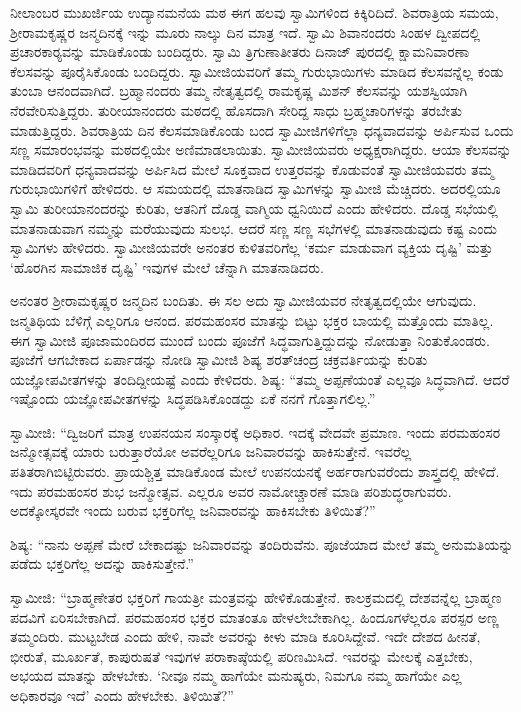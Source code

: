  ನೀಲಾಂಬರ ಮುಖರ್ಜಿಯ ಉದ್ಯಾನಮನೆಯ ಮಠ ಈಗ ಹಲವು ಸ್ವಾಮಿಗಳಿಂದ ಕಿಕ್ಕಿರಿದಿದೆ. ಶಿವರಾತ್ರಿಯ ಸಮಯ, ಶ‍್ರೀರಾಮಕೃಷ್ಣರ ಜನ್ಮದಿನಕ್ಕೆ ಇನ್ನು ಮೂರು ನಾಲ್ಕು ದಿನ ಮಾತ್ರ ಇದೆ. ಸ್ವಾಮಿ ಶಿವಾನಂದರು ಸಿಂಹಳ ದ್ವೀಪದಲ್ಲಿ ಪ್ರಚಾರಕಾರ‍್ಯವನ್ನು ಮಾಡಿಕೊಂಡು ಬಂದಿದ್ದರು. ಸ್ವಾಮಿ ತ್ರಿಗುಣಾತೀತರು ದಿನಾಜ್ ಪುರದಲ್ಲಿ ಕ್ಷಾಮನಿವಾರಣಾ ಕೆಲಸವನ್ನು ಪೂರೈಸಿಕೊಂಡು ಬಂದಿದ್ದರು. ಸ್ವಾಮೀಜಿಯವರಿಗೆ ತಮ್ಮ ಗುರುಭಾಯಿಗಳು ಮಾಡಿದ ಕೆಲಸವನ್ನೆಲ್ಲ ಕಂಡು ತುಂಬಾ ಆನಂದವಾಗಿದೆ. ಬ್ರಹ್ಮಾನಂದರು ತಮ್ಮ ನೇತೃತ್ವದಲ್ಲಿ ರಾಮಕೃಷ್ಣ ಮಿಶನ್ ಕೆಲಸವನ್ನು ಯಶಸ್ವಿಯಾಗಿ ನೆರವೇರಿಸುತ್ತಿದ್ದರು. ತುರೀಯಾನಂದರು ಮಠದಲ್ಲಿ ಹೊಸದಾಗಿ ಸೇರಿದ್ದ ಸಾಧು ಬ್ರಹ್ಮಚಾರಿಗಳನ್ನು ತರಬೇತು ಮಾಡುತ್ತಿದ್ದರು. ಶಿವರಾತ್ರಿಯ ದಿನ ಕೆಲಸಮಾಡಿಕೊಂಡು ಬಂದ ಸ್ವಾಮೀಜಿಗಳಿಗೆಲ್ಲಾ ಧನ್ಯವಾದವನ್ನು ಅರ್ಪಿಸುವ ಒಂದು ಸಣ್ಣ ಸಮಾರಂಭವನ್ನು ಮಠದಲ್ಲಿಯೇ ಅಣಿಮಾಡಲಾಯಿತು. ಸ್ವಾಮೀಜಿಯವರು ಅಧ್ಯಕ್ಷರಾಗಿದ್ದರು. ಆಯಾ ಕೆಲಸವನ್ನು ಮಾಡಿದವರಿಗೆ ಧನ್ಯವಾದವನ್ನು ಅರ್ಪಿಸಿದ ಮೇಲೆ ಸೂಕ್ತವಾದ ಉತ್ತರವನ್ನು ಕೊಡುವಂತೆ ಸ್ವಾಮೀಜಿಯವರು ತಮ್ಮ ಗುರುಭಾಯಿಗಳಿಗೆ ಹೇಳಿದರು. ಆ ಸಮಯದಲ್ಲಿ ಮಾತನಾಡಿದ ಸ್ವಾಮಿಗಳನ್ನು ಸ್ವಾಮೀಜಿ ಮೆಚ್ಚಿದರು. ಅದರಲ್ಲಿಯೂ ಸ್ವಾಮಿ ತುರೀಯಾನಂದರನ್ನು ಕುರಿತು, ಆತನಿಗೆ ದೊಡ್ಡ ವಾಗ್ಮಿಯ ಧ್ವನಿಯಿದೆ ಎಂದು ಹೇಳಿದರು. ದೊಡ್ಡ ಸಭೆಯಲ್ಲಿ ಮಾತನಾಡುವಾಗ ನಮ್ಮನ್ನು ಮರೆಯುವುದು ಸುಲಭ. ಆದರೆ ಸಣ್ಣ ಸಣ್ಣ ಸಭೆಗಳಲ್ಲಿ ಮಾತನಾಡುವುದು ಕಷ್ಟ ಎಂದು ಸ್ವಾಮಿಗಳು ಹೇಳಿದರು. ಸ್ವಾಮೀಜಿಯವರೇ ಅನಂತರ ಕುಳಿತವರಿಗೆಲ್ಲ ‘ಕರ್ಮ ಮಾಡುವಾಗ ವ್ಯಕ್ತಿಯ ದೃಷ್ಟಿ’ ಮತ್ತು ‘ಹೊರಗಿನ ಸಾಮಾಜಿಕ ದೃಷ್ಟಿ’ ಇವುಗಳ ಮೇಲೆ ಚೆನ್ನಾಗಿ ಮಾತನಾಡಿದರು. 

 ಅನಂತರ ಶ‍್ರೀರಾಮಕೃಷ್ಣರ ಜನ್ಮದಿನ ಬಂದಿತು. ಈ ಸಲ ಅದು ಸ್ವಾಮೀಜಿಯವರ ನೇತೃತ್ವದಲ್ಲಿಯೇ ಆಗುವುದು. ಜನ್ಮತಿಥಿಯ ಬೆಳಿಗ್ಗೆ ಎಲ್ಲರಿಗೂ ಆನಂದ. ಪರಮಹಂಸರ ಮಾತನ್ನು ಬಿಟ್ಟು ಭಕ್ತರ ಬಾಯಲ್ಲಿ ಮತ್ತೊಂದು ಮಾತಿಲ್ಲ. ಈಗ ಸ್ವಾಮೀಜಿ ಪೂಜಾಮಂದಿರದ ಮುಂದೆ ಬಂದು ಪೂಜೆಗೆ ಸಿದ್ಧವಾಗುತ್ತಿದ್ದುದನ್ನು ನೋಡುತ್ತಾ ನಿಂತುಕೊಂಡರು. ಪೂಜೆಗೆ ಆಗಬೇಕಾದ ಏರ್ಪಾಡನ್ನು ನೋಡಿ ಸ್ವಾಮೀಜಿ ಶಿಷ್ಯ ಶರತ್‍ಚಂದ್ರ ಚಕ್ರವರ್ತಿಯನ್ನು ಕುರಿತು ಯಜ್ಞೋಪವೀತಗಳನ್ನು ತಂದಿದ್ದೀಯಷ್ಟೆ ಎಂದು ಕೇಳಿದರು. ಶಿಷ್ಯ: “ತಮ್ಮ ಅಪ್ಪಣೆಯಂತೆ ಎಲ್ಲವೂ ಸಿದ್ಧವಾಗಿದೆ. ಆದರೆ ಇಷ್ಟೊಂದು ಯಜ್ಞೋಪವೀತಗಳನ್ನು ಸಿದ್ಧಪಡಿಸಿಕೊಂಡದ್ದು ಏಕೆ ನನಗೆ ಗೊತ್ತಾಗಲಿಲ್ಲ.” 

 ಸ್ವಾಮೀಜಿ: “ದ್ವಿಜರಿಗೆ ಮಾತ್ರ ಉಪನಯನ ಸಂಸ್ಕಾರಕ್ಕೆ ಅಧಿಕಾರ. ಇದಕ್ಕೆ ವೇದವೇ ಪ್ರಮಾಣ. ಇಂದು ಪರಮಹಂಸರ ಜನ್ಮೋತ್ಸವಕ್ಕೆ ಯಾರು ಬರುತ್ತಾರೆಯೋ ಅವರೆಲ್ಲರಿಗೂ ಜನಿವಾರವನ್ನು ಹಾಕಿಸುತ್ತೇನೆ. ಇವರೆಲ್ಲ ಪತಿತರಾಗಿಬಿಟ್ಟಿರುವರು. ಪ್ರಾಯಶ್ಚಿತ್ತ ಮಾಡಿಕೊಂಡ ಮೇಲೆ ಉಪನಯನಕ್ಕೆ ಅರ್ಹರಾಗುವರೆಂದು ಶಾಸ್ತ್ರದಲ್ಲಿ ಹೇಳಿದೆ. ಇದು ಪರಮಹಂಸರ ಶುಭ ಜನ್ಮೋತ್ಸವ. ಎಲ್ಲರೂ ಅವರ ನಾಮೋಚ್ಚಾರಣೆ ಮಾಡಿ ಪರಿಶುದ್ಧರಾಗುವರು. ಅದಕ್ಕೋಸ್ಕರವೇ ಇಂದು ಬರುವ ಭಕ್ತರಿಗೆಲ್ಲ ಜನಿವಾರವನ್ನು ಹಾಕಿಸಬೇಕು ತಿಳಿಯಿತೆ?” 

 ಶಿಷ್ಯ: “ನಾನು ಅಪ್ಪಣೆ ಮೇರೆ ಬೇಕಾದಷ್ಟು ಜನಿವಾರವನ್ನು ತಂದಿರುವೆನು. ಪೂಜೆಯಾದ ಮೇಲೆ ತಮ್ಮ ಅನುಮತಿಯನ್ನು ಪಡೆದು ಭಕ್ತರಿಗೆಲ್ಲ ಅದನ್ನು ಹಾಕಿಸುತ್ತೇನೆ.” 

 ಸ್ವಾಮೀಜಿ: “ಬ್ರಾಹ್ಮಣೇತರ ಭಕ್ತರಿಗೆ ಗಾಯತ್ರೀ ಮಂತ್ರವನ್ನು ಹೇಳಿಕೊಡುತ್ತೇನೆ. ಕಾಲಕ್ರಮದಲ್ಲಿ ದೇಶವನ್ನೆಲ್ಲ ಬ್ರಾಹ್ಮಣ ಪದವಿಗೆ ಏರಿಸಬೇಕಾಗಿದೆ. ಪರಮಹಂಸರ ಭಕ್ತರ ಮಾತಂತೂ ಹೇಳಲೇಬೇಕಾಗಿಲ್ಲ. ಹಿಂದೂಗಳೆಲ್ಲರೂ ಪರಸ್ಪರ ಅಣ್ಣ ತಮ್ಮಂದಿರು. ಮುಟ್ಟಬೇಡ ಎಂದು ಹೇಳಿ, ನಾವೇ ಅವರನ್ನು ಕೀಳು ಮಾಡಿ ಕೂರಿಸಿದ್ದೇವೆ. ಇದೇ ದೇಶದ ಹೀನತೆ, ಭೀರುತೆ, ಮೂರ್ಖತೆ, ಕಾಪುರುಷತೆ ಇವುಗಳ ಪರಾಕಾಷ್ಠೆಯಲ್ಲಿ ಪರಿಣಮಿಸಿದೆ. ಇವರನ್ನು ಮೇಲಕ್ಕೆ ಎತ್ತಬೇಕು, ಅಭಯದ ಮಾತನ್ನು ಹೇಳಬೇಕು. ‘ನೀವೂ ನಮ್ಮ ಹಾಗೆಯೇ ಮನುಷ್ಯರು, ನಿಮಗೂ ನಮ್ಮ ಹಾಗೆಯೇ ಎಲ್ಲ ಅಧಿಕಾರವೂ ಇದೆ’ ಎಂದು ಹೇಳಬೇಕು. ತಿಳಿಯಿತೆ?” 

